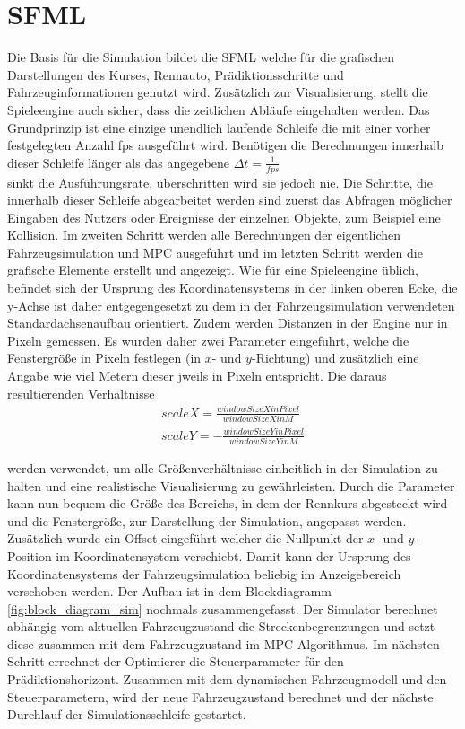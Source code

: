 \documentclass{like}
\begin{document}
\section{\acl{SFML}}
Die Basis für die Simulation bildet die \ac{SFML} welche für die grafischen Darstellungen des Kurses, Rennauto, Prädiktionsschritte und Fahrzeuginformationen genutzt wird. Zusätzlich zur Visualisierung, stellt die Spieleengine auch sicher, dass die zeitlichen Abläufe eingehalten werden. Das Grundprinzip ist eine einzige unendlich laufende Schleife die mit einer vorher festgelegten Anzahl \ac{fps} ausgeführt wird. Benötigen die Berechnungen innerhalb dieser Schleife länger als das angegebene
$\Delta t = \frac{1}{fps}$ \\
sinkt die Ausführungsrate, überschritten wird sie jedoch nie. Die Schritte, die innerhalb dieser Schleife abgearbeitet werden sind zuerst das Abfragen möglicher Eingaben des Nutzers oder Ereignisse der einzelnen Objekte, zum Beispiel eine Kollision. Im zweiten Schritt werden alle Berechnungen der eigentlichen Fahrzeugsimulation und \ac{MPC} ausgeführt und im letzten Schritt werden die grafische Elemente erstellt und angezeigt. Wie für eine Spieleengine üblich, befindet sich der Ursprung des Koordinatensystems in der linken oberen Ecke, die y-Achse ist daher entgegengesetzt zu dem in der Fahrzeugsimulation verwendeten Standardachsenaufbau orientiert. Zudem werden Distanzen in der Engine nur in Pixeln gemessen. Es wurden daher zwei Parameter eingeführt, welche die Fenstergröße in Pixeln festlegen (in \(x\)- und  \(y\)-Richtung)
und zusätzlich eine Angabe wie viel Metern dieser jweils in Pixeln entspricht. Die daraus resultierenden Verhältnisse \\
\begin{eqnarray}
	scaleX = \frac{windowSizeXinPixel}{windowSizeXinM} \\
	scaleY = - \frac{windowSizeYinPixel}{windowSizeYinM} 
\end{eqnarray}

werden verwendet, um alle Größenverhältnisse einheitlich in der Simulation zu halten und eine realistische Visualisierung zu gewährleisten. Durch die Parameter kann nun bequem die Größe des Bereichs, in dem der Rennkurs abgesteckt wird und die Fenstergröße, zur Darstellung der Simulation, angepasst werden. Zusätzlich wurde ein Offset eingeführt welcher die Nullpunkt der \(x\)- und \(y\)-Position im Koordinatensystem verschiebt. Damit kann der Ursprung des Koordinatensystems der Fahrzeugsimulation beliebig im Anzeigebereich verschoben werden. 
Der Aufbau ist in dem Blockdiagramm \ref{fig:block_diagram_sim} nochmals zusammengefasst. Der Simulator berechnet abhängig vom aktuellen Fahrzeugzustand die Streckenbegrenzungen und setzt diese zusammen mit dem Fahrzeugzustand im \ac{MPC}-Algorithmus. Im nächsten Schritt errechnet der Optimierer die Steuerparameter für den Prädiktionshorizont. Zusammen mit dem dynamischen Fahrzeugmodell und den Steuerparametern, wird der neue Fahrzeugzustand berechnet und der nächste Durchlauf der Simulationsschleife gestartet.
\end{document}
